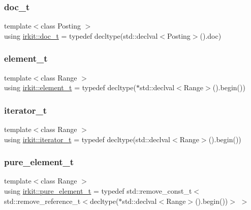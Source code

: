 \mbox{\label{namespaceirkit_a595d83053e112c98ab2a1b65e5dd74be}} 
\subsubsection{\texorpdfstring{doc\+\_\+t}{doc\_t}}
{\footnotesize\ttfamily template$<$class Posting $>$ \\
using \hyperlink{namespaceirkit_a595d83053e112c98ab2a1b65e5dd74be}{irkit\+::doc\+\_\+t} = typedef decltype(std\+::declval$<$Posting$>$().doc)}

\mbox{\label{namespaceirkit_a40deb8b0d47ecaada4b47270b97d5469}} 
\subsubsection{\texorpdfstring{element\+\_\+t}{element\_t}}
{\footnotesize\ttfamily template$<$class Range $>$ \\
using \hyperlink{namespaceirkit_a40deb8b0d47ecaada4b47270b97d5469}{irkit\+::element\+\_\+t} = typedef decltype($\ast$std\+::declval$<$Range$>$().begin())}

\mbox{\label{namespaceirkit_af390a50be8f636e7239c650e5043c56f}} 
\subsubsection{\texorpdfstring{iterator\+\_\+t}{iterator\_t}}
{\footnotesize\ttfamily template$<$class Range $>$ \\
using \hyperlink{namespaceirkit_af390a50be8f636e7239c650e5043c56f}{irkit\+::iterator\+\_\+t} = typedef decltype(std\+::declval$<$Range$>$().begin())}

\mbox{\label{namespaceirkit_afcffab67300c5c703cb38a363c9a6f1d}} 
\subsubsection{\texorpdfstring{pure\+\_\+element\+\_\+t}{pure\_element\_t}}
{\footnotesize\ttfamily template$<$class Range $>$ \\
using \hyperlink{namespaceirkit_afcffab67300c5c703cb38a363c9a6f1d}{irkit\+::pure\+\_\+element\+\_\+t} = typedef std\+::remove\+\_\+const\+\_\+t$<$ std\+::remove\+\_\+reference\+\_\+t$<$decltype($\ast$std\+::declval$<$Range$>$().begin())$>$ $>$}

